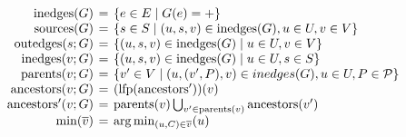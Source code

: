 \[
  \arraycolsep=2pt
  \begin{array}{rcl}
    \inedges(G)      & {=} & \Setof{e \in E \suchthat G(e) = +}                                                   \\
    \sources(G)      & {=} & \Setof{s \in S \suchthat (u, s, v) \in \inedges(G), u \in U, v \in V}                \\
    \outedges(s;G)   & {=} & \Setof{(u, s, v) \in \inedges(G) \suchthat u \in U, v \in V}                         \\
    \inedges(v;G)    & {=} & \Setof{(u, s, v) \in \inedges(G) \suchthat u \in U, s \in S}                         \\
    \parents(v;G)    & {=} & \Setof{v' \in V \suchthat (u, (v', P), v) \in inedges(G), u \in U, P \in \Positions} \\
    \ancestors(v;G)  & {=} & (\lfp(\ancestors'))(v)                                                               \\
    \ancestors'(v;G) & {=} & \parents(v) \bigcup_{v' \in \parents(v)} \ancestors(v')                              \\
    \min(\Set{v})    & {=} & \argmin_{(u, C) \in \Set{v}}(u)                                                      \\
  \end{array}
\]
